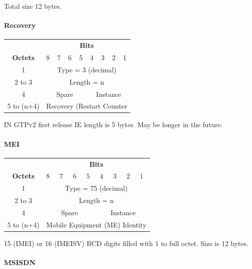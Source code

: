 Total size 12 bytes.


\paragraph{Recovery}

\begin{tabular}{c|p{1cm}|p{1cm}|p{1cm}|p{1cm}|p{1cm}|p{1cm}|p{1cm}|p{1cm}|}
\multicolumn{1}{c}{} & \multicolumn{8}{c}{\textbf{Bits}} \\
\cline{2-9} \textbf{Octets} & 8 & 7 & 6 & 5 & 4 & 3 & 2 & 1 \\ 
\cline{2-9} 1 & \multicolumn{8}{c|}{Type = 3 (decimal)} \\ 
\cline{2-9} 2 to 3 & \multicolumn{8}{c|}{Length = n}  \\ 
\cline{2-9} 4 & \multicolumn{4}{c|}{Spare} & \multicolumn{4}{c|}{Instance} \\ 
\cline{2-9} 5 to (n+4) & \multicolumn{8}{c|}{Recovery (Restart Counter} \\ 
\cline{2-9}
\end{tabular} 

IN GTPv2 first release IE length is 5 bytes. May be longer in the future.


\paragraph{MEI}

\begin{tabular}{c|p{1cm}|p{1cm}|p{1cm}|p{1cm}|p{1cm}|p{1cm}|p{1cm}|p{1cm}|}
\multicolumn{1}{c}{} & \multicolumn{8}{c}{\textbf{Bits}} \\
\cline{2-9} \textbf{Octets} & 8 & 7 & 6 & 5 & 4 & 3 & 2 & 1 \\ 
\cline{2-9} 1 & \multicolumn{8}{c|}{Type = 75 (decimal)} \\ 
\cline{2-9} 2 to 3 & \multicolumn{8}{c|}{Length = n}  \\ 
\cline{2-9} 4 & \multicolumn{4}{c|}{Spare} & \multicolumn{4}{c|}{Instance} \\ 
\cline{2-9} 5 to (n+4) & \multicolumn{8}{c|}{Mobile Equipment (ME) Identity} \\ 
\cline{2-9}
\end{tabular} 

15 (IMEI) or 16 (IMEISV) BCD digits filled with 1 to full octet. Size is 12 bytes.

\paragraph{MSISDN}

